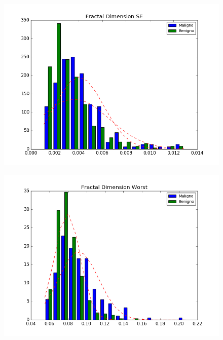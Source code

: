 \documentclass[11pt,a4paper]{article}
\numberwithin{equation}{section}
\begin{document}
\begin{itemize}
\begin{figure}[H]
\centering
\begin{minipage}{.5\textwidth}
  \centering
  \includegraphics[width=\linewidth]{../img/hist/fractal_dimension_se}
  \label{fig:test1}
\end{minipage}%
\begin{minipage}{.5\textwidth}
  \centering
  \includegraphics[width=\linewidth]{../img/hist/fractal_dimension_worst}
  \label{fig:test2}
\end{minipage}
\end{figure}
\end{itemize}
\end{document}

